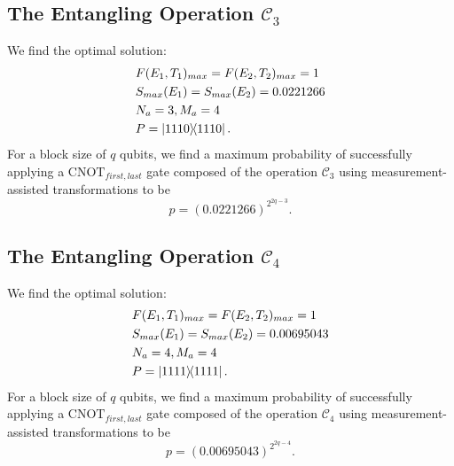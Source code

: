 \documentclass[aps,pra,twocolumn,showpacs,superscriptaddress,floatfix,10pt]{revtex4}
\begin{document}
\subsection{The Entangling Operation $\mathcal{C}_3$}
We find the optimal solution:
\begin{eqnarray}
& F(E_1,T_1)_{max} = F(E_2,T_2)_{max} = 1 \nonumber \\
& S_{max}(E_1) = S_{max}(E_2) = 0.0221266 \\
& N_a = 3,M_a=4 \nonumber \\
& P = \outerproduct{1110}{1110} .\nonumber	
\end{eqnarray}
For a block size of $q$ qubits, we find a maximum probability of successfully applying a $\mbox{CNOT}_{first,last}$ gate composed of the operation $\mathcal{C}_3$ using measurement-assisted transformations to be
\begin{equation}
\label{1C4T Result}
p = (0.0221266)^{2^{2q-3}}.
\end{equation}
\subsection{The Entangling Operation $\mathcal{C}_4$}
We find the optimal solution:
 \begin{eqnarray}
 & F(E_1,T_1)_{max} = F(E_2,T_2)_{max} = 1 \nonumber\\
 & S_{max}(E_1) = S_{max}(E_2) = 0.00695043 \\
 & N_a = 4,M_a=4 \nonumber\\
 & P = \outerproduct{1111}{1111}. \nonumber	
 \end{eqnarray}
For a block size of $q$ qubits, we find a maximum probability of successfully applying a $\mbox{CNOT}_{first,last}$ gate composed of the operation $\mathcal{C}_4$ using measurement-assisted transformations to be
 \begin{equation}
 \label{2C4T Result}
 p = (0.00695043)^{2^{2q-4}}.
 \end{equation}
\end{document}

